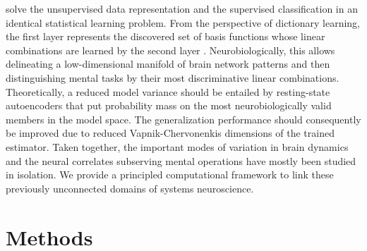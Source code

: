 \documentclass{article} %
\begin{document}
solve the unsupervised data representation and the supervised classification
in an identical statistical learning problem.
From the perspective of dictionary learning, the first layer represents
the discovered set of basis functions
whose linear combinations are learned
by the second layer \cite{olshausen96}.
%
Neurobiologically, this allows 
delineating a low-dimensional manifold of brain network patterns and then 
distinguishing mental tasks
by their most discriminative linear combinations.
%
Theoretically, a reduced model variance should be entailed by
resting-state autoencoders that
put probability mass on the most neurobiologically
valid members in the model space.
%
The generalization performance should consequently be improved due to 
reduced Vapnik-Chervonenkis dimensions of the trained estimator.
%
Taken together,
the important modes of variation in brain dynamics and
the neural correlates subserving mental operations
have mostly been studied in isolation.
We provide a principled computational framework to link these previously
unconnected domains of systems neuroscience.


\section{Methods}
%
\end{document}
